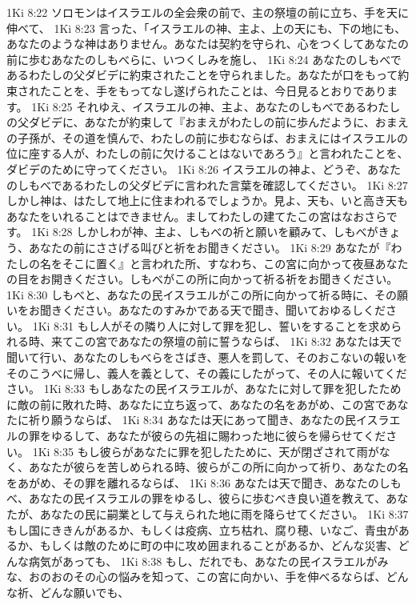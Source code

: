 1Ki 8:22  ソロモンはイスラエルの全会衆の前で、主の祭壇の前に立ち、手を天に伸べて、
1Ki 8:23  言った、「イスラエルの神、主よ、上の天にも、下の地にも、あなたのような神はありません。あなたは契約を守られ、心をつくしてあなたの前に歩むあなたのしもべらに、いつくしみを施し、
1Ki 8:24  あなたのしもべであるわたしの父ダビデに約束されたことを守られました。あなたが口をもって約束されたことを、手をもってなし遂げられたことは、今日見るとおりであります。
1Ki 8:25  それゆえ、イスラエルの神、主よ、あなたのしもべであるわたしの父ダビデに、あなたが約束して『おまえがわたしの前に歩んだように、おまえの子孫が、その道を慎んで、わたしの前に歩むならば、おまえにはイスラエルの位に座する人が、わたしの前に欠けることはないであろう』と言われたことを、ダビデのために守ってください。
1Ki 8:26  イスラエルの神よ、どうぞ、あなたのしもべであるわたしの父ダビデに言われた言葉を確認してください。
1Ki 8:27  しかし神は、はたして地上に住まわれるでしょうか。見よ、天も、いと高き天もあなたをいれることはできません。ましてわたしの建てたこの宮はなおさらです。
1Ki 8:28  しかしわが神、主よ、しもべの祈と願いを顧みて、しもべがきょう、あなたの前にささげる叫びと祈をお聞きください。
1Ki 8:29  あなたが『わたしの名をそこに置く』と言われた所、すなわち、この宮に向かって夜昼あなたの目をお開きください。しもべがこの所に向かって祈る祈をお聞きください。
1Ki 8:30  しもべと、あなたの民イスラエルがこの所に向かって祈る時に、その願いをお聞きください。あなたのすみかである天で聞き、聞いておゆるしください。
1Ki 8:31  もし人がその隣り人に対して罪を犯し、誓いをすることを求められる時、来てこの宮であなたの祭壇の前に誓うならば、
1Ki 8:32  あなたは天で聞いて行い、あなたのしもべらをさばき、悪人を罰して、そのおこないの報いをそのこうべに帰し、義人を義として、その義にしたがって、その人に報いてください。
1Ki 8:33  もしあなたの民イスラエルが、あなたに対して罪を犯したために敵の前に敗れた時、あなたに立ち返って、あなたの名をあがめ、この宮であなたに祈り願うならば、
1Ki 8:34  あなたは天にあって聞き、あなたの民イスラエルの罪をゆるして、あなたが彼らの先祖に賜わった地に彼らを帰らせてください。
1Ki 8:35  もし彼らがあなたに罪を犯したために、天が閉ざされて雨がなく、あなたが彼らを苦しめられる時、彼らがこの所に向かって祈り、あなたの名をあがめ、その罪を離れるならば、
1Ki 8:36  あなたは天で聞き、あなたのしもべ、あなたの民イスラエルの罪をゆるし、彼らに歩むべき良い道を教えて、あなたが、あなたの民に嗣業として与えられた地に雨を降らせてください。
1Ki 8:37  もし国にききんがあるか、もしくは疫病、立ち枯れ、腐り穂、いなご、青虫があるか、もしくは敵のために町の中に攻め囲まれることがあるか、どんな災害、どんな病気があっても、
1Ki 8:38  もし、だれでも、あなたの民イスラエルがみな、おのおのその心の悩みを知って、この宮に向かい、手を伸べるならば、どんな祈、どんな願いでも、
